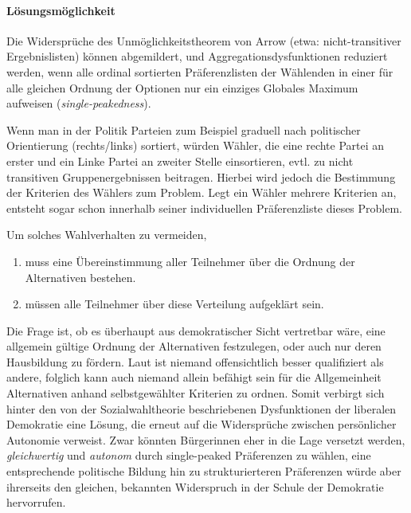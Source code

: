 \paragraph{Lösungsmöglichkeit}

Die Widersprüche des Unmöglichkeitstheorem von Arrow (etwa: nicht-transitiver Ergebnislisten) können abgemildert, und Aggregationsdysfunktionen reduziert werden, wenn alle ordinal sortierten Präferenzlisten der Wählenden in einer für alle gleichen Ordnung der Optionen nur ein einziges Globales Maximum aufweisen (\emph{single-peakedness}).

Wenn man in der Politik Parteien zum Beispiel graduell nach politischer Orientierung (rechts/links) sortiert, würden Wähler, die eine rechte Partei an erster und ein Linke Partei an zweiter Stelle einsortieren, evtl. zu nicht transitiven Gruppenergebnissen beitragen.
Hierbei wird jedoch die Bestimmung der Kriterien des Wählers zum Problem.
Legt ein Wähler mehrere Kriterien an, entsteht sogar schon innerhalb seiner individuellen Präferenzliste dieses Problem.

Um solches Wahlverhalten zu vermeiden,

\begin{enumerate}
	\item muss eine Übereinstimmung aller Teilnehmer über die Ordnung der Alternativen bestehen.

	\item müssen alle Teilnehmer über diese Verteilung aufgeklärt sein.
\end{enumerate}

Die Frage ist, ob es überhaupt aus demokratischer Sicht vertretbar wäre, eine allgemein gültige Ordnung der Alternativen festzulegen, oder auch nur deren Hausbildung zu fördern.
Laut \citeauthor{Dahl-1989-aa} ist niemand offensichtlich besser qualifiziert als andere, folglich kann auch niemand allein befähigt sein für die Allgemeinheit Alternativen anhand selbstgewählter Kriterien zu ordnen.
Somit verbirgt sich hinter den von der Sozialwahltheorie beschriebenen Dysfunktionen der liberalen Demokratie eine Lösung, die erneut auf die Widersprüche zwischen persönlicher Autonomie verweist.
Zwar könnten Bürgerinnen eher in die Lage versetzt werden, \emph{gleichwertig} und \emph{autonom} durch single-peaked Präferenzen zu wählen, eine entsprechende politische Bildung hin zu strukturierteren Präferenzen würde aber ihrerseits den gleichen, bekannten Widerspruch in der Schule der Demokratie hervorrufen.
